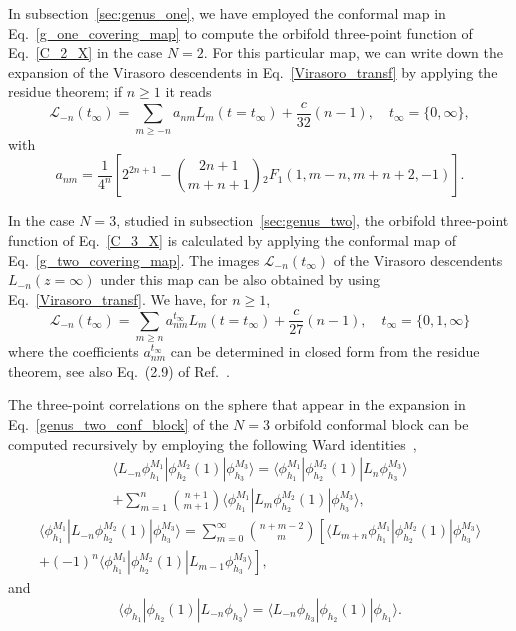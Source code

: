 \documentclass[a4paper,11pt]{article}
\begin{document}
In subsection~\ref{sec:genus_one}, we have employed the conformal map
in Eq.~\eqref{g_one_covering_map} to compute the orbifold three-point function
of Eq.~\eqref{C_2_X} in the case $N=2$. For this particular map, 
we can write down the expansion of the Virasoro descendents in Eq.~\eqref{Virasoro_transf}
by applying the residue theorem; if $n\geq 1$ it reads
\begin{equation}\label{vir_g1_1}
 \mathcal{L}_{-n}(t_{\infty})=\sum_{m\geq -n} a_{nm} L_{m}(t=t_{\infty})+\frac{c}{32}(n-1), \quad t_{\infty}=\{0,\infty\},
\end{equation}
with
\begin{equation}\label{vir_g1_2}
 a_{nm}=\frac{1}{4^n}\left[2^{2n+1}-\binom{2n+1}{m+n+1}{}_2F_1(1, m-n, m+n+2, -1)\right].
\end{equation}

In the case $N=3$, studied in subsection~\ref{sec:genus_two}, the orbifold three-point function of Eq.~\eqref{C_3_X} is calculated by
applying the conformal map of Eq.~\eqref{g_two_covering_map}. The images $\mathcal{L}_{-n}(t_\infty)$ of the Virasoro descendents 
$L_{-n}(z=\infty)$ under this map can be also obtained by using Eq.~\eqref{Virasoro_transf}. We have, for $n\geq 1$,
\begin{equation}\label{vir_g2} 
 \mathcal{L}_{-n}(t_\infty)=\sum_{m\geq n}a_{nm}^{t_\infty}L_{m}(t=t_{\infty})+\frac{c}{27}(n-1),
 \quad t_\infty=\{0, 1, \infty\}
\end{equation}
where the coefficients $a_{nm}^{t_\infty}$ can be determined in closed form from the residue theorem, see also Eq.~(2.9) of Ref.~\cite{Collier}.

The three-point correlations on the sphere that appear in the expansion in Eq.~\eqref{genus_two_conf_block} of the $N=3$ orbifold 
conformal block can be computed recursively by employing the following Ward identities~\cite{Teschner},
\begin{multline}
\label{wardvir1}
 \langle L_{-n}\phi_{h_1}^{M_1}|\phi_{h_2}^{M_2}(1)|\phi_{h_3}^{M_3}\rangle=
 \langle \phi_{h_1}^{M_1}|\phi_{h_2}^{M_2}(1)|L_n \phi_{h_3}^{M_3}\rangle \\
 +\sum_{m= 1}^n \binom{n+1}{m+1}\langle \phi_{h_1}^{M_1}|L_m \phi_{h_2}^{M_2}(1)|\phi_{h_3}^{M_3}\rangle,
\end{multline}
\begin{multline}
\label{wardvir2}
 \langle \phi_{h_1}^{M_1}|L_{-n}\phi_{h_2}^{M_2}(1)|\phi_{h_3}^{M_3}\rangle=
 \sum_{m=0}^\infty\binom{n+m-2}{m}
 \left[\langle L_{m+n} \phi_{h_1}^{M_1}|\phi_{h_2}^{M_2}(1)|\phi_{h_3}^{M_3}\rangle \right.\\ +
 \left. (-1)^n\langle \phi_{h_1}^{M_1}|\phi_{h_2}^{M_2}(1)|L_{m-1} \phi_{h_3}^{M_3}\rangle\right],
\end{multline}
and
\begin{equation}
 \langle \phi_{h_1}|\phi_{h_2}(1)|L_{-n}\phi_{h_3}\rangle=
 \langle L_{-n}\phi_{h_3}|\phi_{h_2}(1)|\phi_{h_1}\rangle.
\end{equation}
\end{document}

